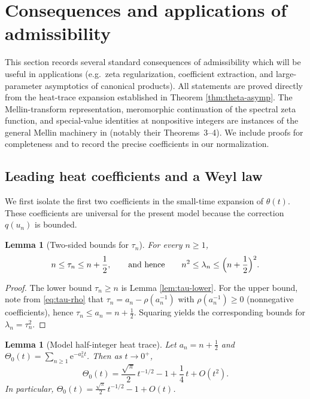 \documentclass[11pt,letterpaper]{amsart}
\numberwithin{equation}{section}
\newtheorem{lemma}[theorem]{Lemma}
\theoremstyle{definition}
\newcommand{\e}{\mathrm{e}}
\begin{document}
\section{Consequences and applications of admissibility}\label{sec:consequences}

This section records several standard consequences of admissibility which will be useful
in applications (e.g.\ zeta regularization, coefficient extraction, and large-parameter
asymptotics of canonical products). All statements are proved directly from the heat-trace expansion established in Theorem \ref{thm:theta-asymp}. The Mellin-transform representation, meromorphic continuation of the spectral zeta function, and special-value identities at nonpositive integers are instances of the general Mellin machinery in \cite[\S2]{QHS} (notably their Theorems~3--4). We include proofs for completeness and to record the precise coefficients in our normalization.

\subsection{Leading heat coefficients and a Weyl law}

We first isolate the first two coefficients in the small-time expansion of $\theta(t)$.
These coefficients are universal for the present model because the correction $q(u_n)$ is bounded.

\begin{lemma}[Two-sided bounds for $\tau_n$]\label{lem:tau-two-sided}
For every $n\ge 1$,
\[
n\le \tau_n \le n+\frac12,
\qquad\text{and hence}\qquad
n^2\le \lambda_n\le \Bigl(n+\frac12\Bigr)^2.
\]
\end{lemma}

\begin{proof}
The lower bound $\tau_n\ge n$ is Lemma \ref{lem:tau-lower}.
For the upper bound, note from \eqref{eq:tau-rho} that $\tau_n=a_n-\rho(a_n^{-1})$ with
$\rho(a_n^{-1})\ge 0$ (nonnegative coefficients), hence $\tau_n\le a_n=n+\tfrac12$.
Squaring yields the corresponding bounds for $\lambda_n=\tau_n^2$.
\end{proof}

\begin{lemma}[Model half-integer heat trace]\label{lem:Theta0-two-terms}
Let $a_n=n+\tfrac12$ and $\Theta_0(t)=\sum_{n\ge 1}\e^{-a_n^2 t}$.
Then as $t\to 0^+$,
\begin{equation}\label{eq:Theta0-two-terms}
\Theta_0(t)=\frac{\sqrt{\pi}}{2}\,t^{-1/2}-1+\frac14\,t+O(t^2).
\end{equation}
In particular, $\Theta_0(t)=\frac{\sqrt{\pi}}{2}\,t^{-1/2}-1+O(t)$.
\end{lemma}
\end{document}
